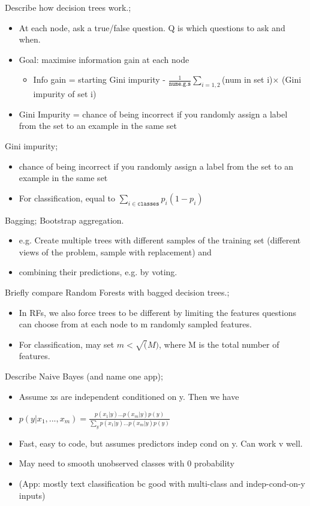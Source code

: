 \documentclass{article}
\begin{document}
Describe how decision trees work.; \begin{itemize} \item At each node, ask a true/false question. Q is which questions to ask and when.  \item Goal: maximise information gain at each node\begin{itemize} \item Info gain = starting Gini impurity - $\frac{1}{\mathtt{num e.g.s}}\sum_{i=1,2}$(num in set i)$\times$ (Gini impurity of set i) \end{itemize} \item Gini Impurity = chance of being incorrect if you randomly assign a label from the set to an example in the same set \end{itemize} 

Gini impurity; \begin{itemize} \item chance of being incorrect if you randomly assign a label from the set to an example in the same set \item For classification, equal to $\sum_{i\in \mathtt{classes}}p_i(1-p_i)$ \end{itemize}

Bagging; Bootstrap aggregation. \begin{itemize} \item e.g. Create multiple trees with different samples of the training set (different views of the problem, sample with replacement) and \item combining their predictions, e.g. by voting.  \end{itemize}

Briefly compare Random Forests with bagged decision trees.; \begin{itemize} \item In RFs, we also force trees to be different by limiting the features questions can choose from at each node to m randomly sampled features.  \item For classification, may set $m<\sqrt(M)$, where M is the total number of features.  \end{itemize}

Describe Naive Bayes (and name one app); \begin{itemize} \item Assume xs are independent conditioned on y. Then we have \item $p(y|x_1,...,x_m) = \frac{p(x_1|y)...p(x_m|y)p(y)}{\sum_y p(x_1|y)...p(x_m|y)p(y)}$ \item Fast, easy to code, but assumes predictors indep cond on y. Can work v well.  \item May need to smooth unobserved classes with 0 probability \item (App: mostly text classification bc good with multi-class and indep-cond-on-y inputs) \end{itemize}
\end{document}
